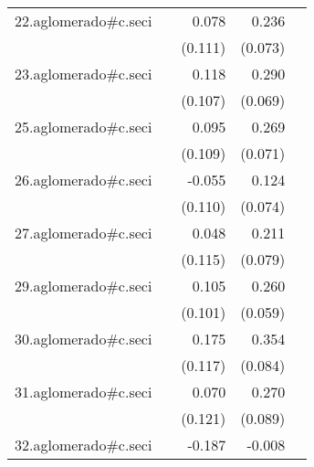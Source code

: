 {\begin{longtable}{l*{4}{D{.}{.}{-1}}}
\addlinespace
22.aglomerado#c.seci&                     &       0.078         &       0.236\sym{**} &                     \\
            &                     &     (0.111)         &     (0.073)         &                     \\
\addlinespace
23.aglomerado#c.seci&                     &       0.118         &       0.290\sym{***}&                     \\
            &                     &     (0.107)         &     (0.069)         &                     \\
\addlinespace
25.aglomerado#c.seci&                     &       0.095         &       0.269\sym{***}&                     \\
            &                     &     (0.109)         &     (0.071)         &                     \\
\addlinespace
26.aglomerado#c.seci&                     &      -0.055         &       0.124         &                     \\
            &                     &     (0.110)         &     (0.074)         &                     \\
\addlinespace
27.aglomerado#c.seci&                     &       0.048         &       0.211\sym{**} &                     \\
            &                     &     (0.115)         &     (0.079)         &                     \\
\addlinespace
29.aglomerado#c.seci&                     &       0.105         &       0.260\sym{***}&                     \\
            &                     &     (0.101)         &     (0.059)         &                     \\
\addlinespace
30.aglomerado#c.seci&                     &       0.175         &       0.354\sym{***}&                     \\
            &                     &     (0.117)         &     (0.084)         &                     \\
\addlinespace
31.aglomerado#c.seci&                     &       0.070         &       0.270\sym{**} &                     \\
            &                     &     (0.121)         &     (0.089)         &                     \\
\addlinespace
32.aglomerado#c.seci&                     &      -0.187         &      -0.008         &                     \\

\end{longtable}}
